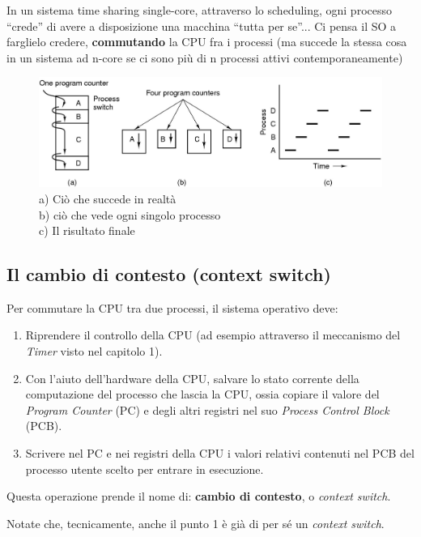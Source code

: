 
In un sistema time sharing single-core, attraverso lo scheduling, ogni processo “crede” di avere a disposizione una macchina “tutta per se”...
Ci pensa il SO a farglielo credere, \textbf{commutando} la CPU fra i processi (ma succede la stessa cosa in un sistema ad n-core se ci sono più di n processi attivi contemporaneamente)
\begin{figure}[h]
    \centering
    \includegraphics[width=0.5\linewidth]{images/SchedulingProcessi.png}
    \caption{a) Ciò che succede in realtà\\b) ciò che vede ogni singolo processo\\c) Il risultato finale}
\end{figure}

\subsection{Il cambio di contesto (context switch)}
Per commutare la CPU tra due processi, il sistema operativo deve:

\begin{enumerate}
    \item Riprendere il controllo della CPU (ad esempio attraverso il meccanismo del \textit{Timer} visto nel capitolo 1).
    \item Con l'aiuto dell'hardware della CPU, salvare lo stato corrente della computazione del processo che lascia la CPU, ossia copiare il valore del \textit{Program Counter} (PC) e degli altri registri nel suo \textit{Process Control Block} (PCB).
    \item Scrivere nel PC e nei registri della CPU i valori relativi contenuti nel PCB del processo utente scelto per entrare in esecuzione.
\end{enumerate}
Questa operazione prende il nome di: \textbf{cambio di contesto}, o \textit{context switch}.

Notate che, tecnicamente, anche il punto 1 è già di per sé un \textit{context switch}.

